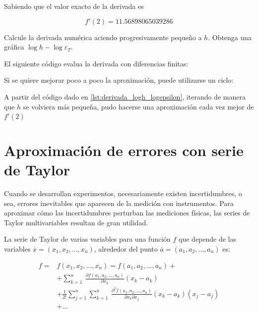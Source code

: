 \begin{ex}
	Sabiendo que el valor exacto de la derivada es

	\begin{equation*}
		f'(2) =11.56898065039286
	\end{equation*}

	Calcule la derivada numérica aciendo progresivamente pequeño a $h$.
	Obtenga una gráfica $\log h - \log \varepsilon_T$.

	\begin{solution}

		El siguiente código evalua la derivada con diferencias finitas:

		

		Si se quiere mejorar poco a poco la aproximación, puede
		utilizarse un ciclo:

		

		A partir del código dado en \ref{lst:derivada_logh_logepsilon},
		iterando de manera que $h$ se volviera más pequeña, pudo hacerse
		una aproximación cada vez mejor de $f'(2)$

	\end{solution}
\end{ex}

\section{Aproximación de errores con serie de Taylor}

Cuando se desarrollan experimentos, necesariamente existen incertidumbres, o
sea, errores inevitables que aparecen de la medición con instrumentos. Para
aproximar cómo las incertidumbres perturban las mediciones físicas, las series
de Taylor multivariables resultan de gran utilidad.

\begin{definition}

	La serie de Taylor de varias variables para una función $f$ que depende
	de las variables $\overline{x} = (x_1, x_2, ..., x_n)$, alrededor del
	punto $ \overline{a} = (a_1, a_2, ..., a_n)$ es:

	\begin{align*}
		f = & f(x_1, x_2, ..., x_n) = f(a_1, a_2, ..., a_n) + \\ 
		    & + \sum_{k=1}^{n} \
		    \frac{\partial f(a_1,a_2,...,a_n)}{\partial x_k}(x_k-a_k)\\
		    & + \frac{1}{2!} \sum_{j=1}^{n} \sum_{k=1}^{n} \
		    \frac{\partial^2 f(a_1,a_2,...,a_n)}{\partial x_k \partial
		    x_j}(x_k-a_k)(x_j-a_j)\\
		    & + ...
	\end{align*}
	\label{eq:def-taylor-multi}

\end{definition}

